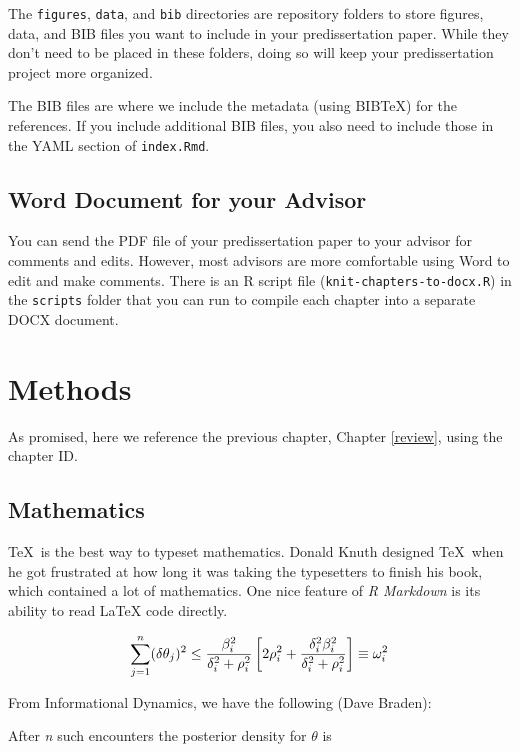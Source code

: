 \documentclass[12pt,letterpaper,oneside,oldfontcommands]{memoir}
\theoremstyle{definition}
\theoremstyle{definition}
\theoremstyle{definition}
\theoremstyle{remark}
\begin{document}
The \texttt{figures}, \texttt{data}, and \texttt{bib} directories are
repository folders to store figures, data, and BIB files you want to
include in your predissertation paper. While they don't need to be
placed in these folders, doing so will keep your predissertation project
more organized.

The BIB files are where we include the metadata (using BIBTeX) for the
references. If you include additional BIB files, you also need to
include those in the YAML section of \texttt{index.Rmd}.

\hypertarget{word-document-for-your-advisor}{%
\section{Word Document for your
Advisor}\label{word-document-for-your-advisor}}

You can send the PDF file of your predissertation paper to your advisor
for comments and edits. However, most advisors are more comfortable
using Word to edit and make comments. There is an R script file
(\texttt{knit-chapters-to-docx.R}) in the \texttt{scripts} folder that
you can run to compile each chapter into a separate DOCX document.

\hypertarget{methods}{%
\chapter{Methods}\label{methods}}

As promised, here we reference the previous chapter, Chapter
\ref{review}, using the chapter ID.

\hypertarget{mathematics}{%
\section{Mathematics}\label{mathematics}}

\TeX~is the best way to typeset mathematics. Donald Knuth designed
\TeX~when he got frustrated at how long it was taking the typesetters to
finish his book, which contained a lot of mathematics. One nice feature
of \emph{R Markdown} is its ability to read LaTeX code directly.

\[\sum_{j=1}^n (\delta\theta_j)^2 \leq {{\beta_i^2}\over{\delta_i^2 + \rho_i^2}}
\left[ 2\rho_i^2 + {\delta_i^2\beta_i^2\over{\delta_i^2 + \rho_i^2}} \right] \equiv \omega_i^2
\]

From Informational Dynamics, we have the following (Dave Braden):

After \emph{n} such encounters the posterior density for \(\theta\) is
\end{document}
